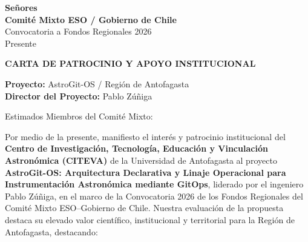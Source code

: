 \documentclass[letterpaper,10.5pt]{article}
\begin{document}
{\raggedleft\small\color{primary}%
\par}

\vspace{0.5cm}

{\raggedright\small
\textbf{\color{primary} Señores} \\
\textbf{\color{primary} Comité Mixto ESO / Gobierno de Chile} \\
Convocatoria a Fondos Regionales 2026 \\
Presente\par}

\vspace{0.5cm}
{\centering\color{primary}\bfseries\fontsize{11.5pt}{15pt}\selectfont
CARTA DE PATROCINIO Y APOYO INSTITUCIONAL\par}
\vspace{0.3cm}

{\small\color{primary}
\textbf{Proyecto:} AstroGit-OS / Región de Antofagasta \\
\textbf{Director del Proyecto:} Pablo Zúñiga\par}

\vspace{0.3cm}
Estimados Miembros del Comité Mixto:
\vspace{0.3cm}

Por medio de la presente, manifiesto el interés y patrocinio institucional del \textbf{Centro de Investigación, Tecnología, Educación y Vinculación Astronómica (CITEVA)} de la Universidad de Antofagasta al proyecto \textbf{AstroGit-OS: Arquitectura Declarativa y Linaje Operacional para Instrumentación Astronómica mediante GitOps}, liderado por el ingeniero Pablo Zúñiga, en el marco de la Convocatoria 2026 de los Fondos Regionales del Comité Mixto ESO--Gobierno de Chile. Nuestra evaluación de la propuesta destaca su elevado valor científico, institucional y territorial para la Región de Antofagasta, destacando:
\end{document}
